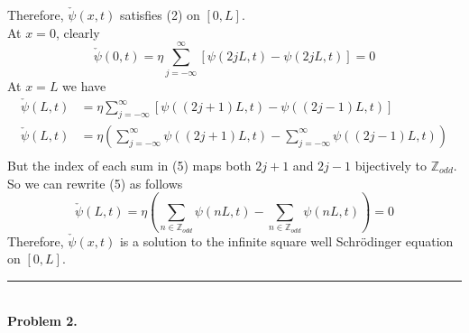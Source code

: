 \documentclass[]{book}
\begin{document}
Therefore, $\check{\psi}(x,t)$ satisfies (2) on $[0,L]$. \\
At $x=0$, clearly
\begin{equation}\label{eq4}
\check{\psi}(0,t)=\eta\sum_{j=-\infty}^{\infty}\left[\psi(2jL,t)-\psi(2jL,t)\right]=0
\end{equation}
At $x=L$ we have
\begin{equation}\label{eq5}
\begin{split}
\check{\psi}(L,t) &=\eta\sum_{j=-\infty}^{\infty}\left[\psi((2j+1)L,t)-\psi((2j-1)L,t)\right] \\
\check{\psi}(L,t) &=\eta\left(\sum_{j=-\infty}^{\infty}\psi((2j+1)L,t)-\sum_{j=-\infty}^{\infty}\psi((2j-1)L,t)\right) \\
\end{split}
\end{equation}
But the index of each sum in (5) maps both $2j+1$ and $2j-1$ bijectively to $\mathbb{Z}_{odd}$. So we can rewrite (5) as follows
\begin{equation}
\check{\psi}(L,t) =\eta\left(\sum_{n\in\mathbb{Z}_{odd}}\psi(nL,t)-\sum_{n\in\mathbb{Z}_{odd}}\psi(nL,t)\right)=0 
\end{equation}
Therefore, $\check{\psi}(x,t)$ is a solution to the infinite square well Schr{\"o}dinger equation on $[0,L]$. \\ 
\noindent\rule{15cm}{0.4pt} \\
{\bf Problem 2.} 
\end{document}
